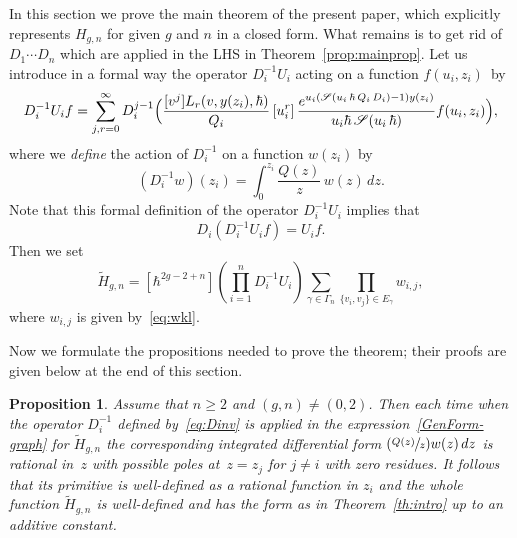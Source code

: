 \documentclass[JEP,XML,SOM,Unicode,NoEqCountersInSection,NoFloatCountersInSection]{cedram}
\let\mathcal\mathscr
\newcommand{\Psfrac}[2]{(\sfrac{#1}{#2})}
\theoremstyle{plain}
\newtheorem{proposition}[theorem]{Proposition}
\theoremstyle{definition}
\theoremstyle{remark}
\newcommand{\cS}{\mathcal{S}}
\newcommand{\Hc}{H}
\begin{document}
In this section we prove the main theorem of the present paper, which explicitly represents $\Hc_{g,n}$ for given $g$ and $n$ in a closed form. What remains is to get rid of $D_1\cdots D_n$ which are applied in the LHS in Theorem~\ref{prop:mainprop}.
Let us introduce in a formal way the operator $D_{i}^{-1}U_i$ acting on a function $f(u_i,z_i)$~by\vspace*{-3pt}
\begin{equation}\label{eq:DinvU}
D_i^{-1}U_{i} f=\sum_{j,r=0}^\infty D_i^{j-1}\Bigl(\frac{[v^j]L_r(v,y(z_i),\hbar)}{Q_i}
\,[u_i^r]\, \frac{e^{u_i(\cS(u_i\,\hbar\,Q_i\,D_i)-1)y(z_i)}}{u_i\hbar\,\cS(u_i\,\hbar)}f(u_i,z_i) \Bigr),
\end{equation}
where we \emph{define} the action of $D_i^{-1}$ on a function $w(z_i)$ by\vspace*{-3pt}
\begin{equation}\label{eq:Dinv}
(D_i^{-1}w)(z_i)=\int_0^{z_i}\frac{Q(z)}{z}\,w(z)\,dz.
\end{equation}
Note that this formal definition of the operator $D_{i}^{-1}U_i$ implies that
\begin{equation}\label{eq:DDinv}
D_i\left(D_{i}^{-1}U_i f\right)=U_if.
\end{equation}
Then we set\vspace*{-3pt}
\begin{equation}
\label{GenForm-graph}
\widetilde H_{g,n} = [\hbar^{2g-2+n}] \left(\textstyle\prod_{i=1}^n D_i^{-1}U_i\right) \sum\limits_{\gamma\in\Gamma_n}\prod\limits_{\{v_i,v_j\}\in E_\gamma} w_{i,j},
\end{equation}
where $w_{i,j}$ is given by~\eqref{eq:wkl}.

Now we formulate the propositions needed to prove the theorem; their proofs are given below at the end of this section.

\begin{proposition}\label{prop:tildeH}
Assume that $n\ge2$ and $(g,n)\ne(0,2)$. Then each time when the operator $D_i^{-1}$ defined by~\eqref{eq:Dinv} is applied in the expression~\eqref{GenForm-graph} for $\widetilde H_{g,n}$ the corresponding integrated differential form $\Psfrac{Q(z)}{z}w(z)\,dz$ is rational in~$z$ with possible poles at~$z=z_j$ for $j\ne i$ with zero residues. It follows that its primitive is well-defined as a rational function in $z_i$ and the whole function $\widetilde H_{g,n}$ is well-defined and has the form as in Theorem~\ref{th:intro} up to an additive constant.
\end{proposition}
\end{document}
